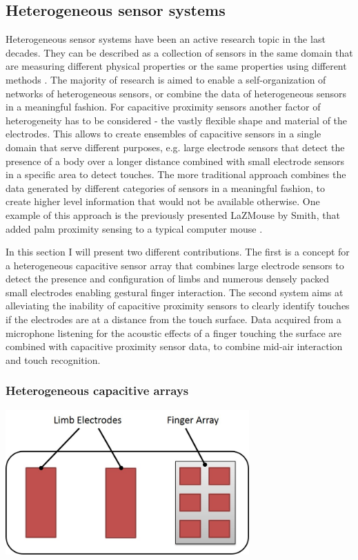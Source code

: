 \subsection{Heterogeneous sensor systems}
\label{ch:proc_hetero}
Heterogeneous sensor systems have been an active research topic in the last decades. They can be described as a collection of sensors in the same domain that are measuring different physical properties or the same properties using different methods \cite{buczak1998self}. The majority of research is aimed to enable a self-organization of networks of heterogeneous sensors, or combine the data of heterogeneous sensors in a meaningful fashion. For capacitive proximity sensors another factor of heterogeneity has to be considered - the vastly flexible shape and material of the electrodes. This allows to create ensembles of capacitive sensors in a single domain that serve different purposes, e.g. large electrode sensors that detect the presence of a body over a longer distance combined with small electrode sensors in a specific area to detect touches. The more traditional approach combines the data generated by different categories of sensors in a meaningful fashion, to create higher level information that would not be available otherwise. One example of this approach is the previously presented LaZMouse by Smith, that added palm proximity sensing to a typical computer mouse \cite{smith1999thesis}.

In this section I will present two different contributions. The first is a concept for a heterogeneous capacitive sensor array that combines large electrode sensors to detect the presence and configuration of limbs and numerous densely packed small electrodes enabling gestural finger interaction. The second system aims at alleviating the inability of capacitive proximity sensors to clearly identify touches if the electrodes are at a distance from the touch surface. Data acquired from a microphone listening for the acoustic effects of a finger touching the surface are combined with capacitive proximity sensor data, to combine mid-air interaction and touch recognition.
\subsubsection{Heterogeneous capacitive arrays}

\begin{minipage}{\linewidth}
\centering
\includegraphics[width=0.7\textwidth]{images/proc_hetero_array}
\label{fig:proc_hetero_array}
\end{minipage}

